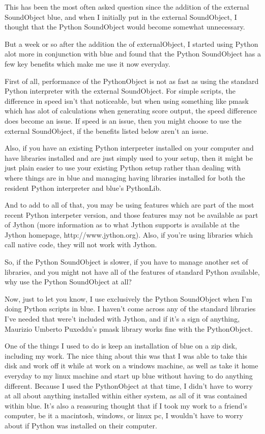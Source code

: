 This has been the most often asked question since the addition of the
external SoundObject blue, and when I initially put in the external
SoundObject, I thought that the Python SoundObject would become somewhat
unnecessary.

But a week or so after the addition the of externalObject, I started
using Python alot more in conjunction with blue and found that the
Python SoundObject has a few key benefits which make me use it now
everyday.

First of all, performance of the PythonObject is not as fast as using
the standard Python interpreter with the external SoundObject. For
simple scripts, the difference in speed isn't that noticeable, but when
using something like pmask which has alot of calculations when
generating score output, the speed difference does become an issue. If
speed is an issue, then you might choose to use the external
SoundObject, if the benefits listed below aren't an issue.

Also, if you have an existing Python interpreter installed on your
computer and have libraries installed and are just simply used to your
setup, then it might be just plain easier to use your existing Python
setup rather than dealing with where things are in blue and managing
having libraries installed for both the resident Python interpreter and
blue's PythonLib.

And to add to all of that, you may be using features which are part of
the most recent Python interpeter version, and those features may not be
available as part of Jython (more information as to what Jython supports
is available at the Jython homepage, http://www.jython.org). Also, if
you're using libraries which call native code, they will not work with
Jython.

So, if the Python SoundObject is slower, if you have to manage another
set of libraries, and you might not have all of the features of standard
Python available, why use the Python SoundObject at all?

Now, just to let you know, I use exclusively the Python SoundObject when
I'm doing Python scripts in blue. I haven't come across any of the
standard libraries I've needed that were't included with Jython, and if
it's a sign of anything, Maurizio Umberto Puxeddu's pmask library works
fine with the PythonObject.

One of the things I used to do is keep an installation of blue on a zip
disk, including my work. The nice thing about this was that I was able
to take this disk and work off it while at work on a windows machine, as
well as take it home everyday to my linux machine and start up blue
without having to do anything different. Because I used the PythonObject
at that time, I didn't have to worry at all about anything installed
within either system, as all of it was contained within blue. It's also
a reassuring thought that if I took my work to a friend's computer, be
it a macintosh, windows, or linux pc, I wouldn't have to worry about if
Python was installed on their computer.

